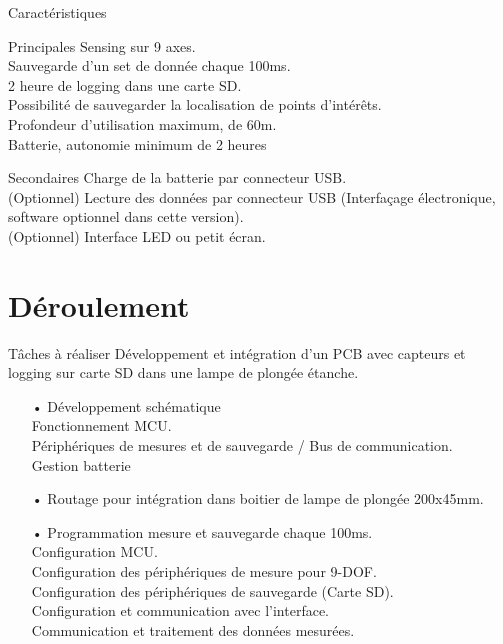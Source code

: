 \documentclass[compress,aspectratio=169]{beamer}
\begin{document}
\begin{frame}{Caractéristiques}
	\begin{alertblock}{Principales}
		Sensing sur 9 axes. \\
		Sauvegarde d’un set de donnée chaque 100ms.\\
		2 heure de logging dans une carte SD. \\
		Possibilité de sauvegarder la localisation de points d’intérêts. \\
		Profondeur d’utilisation maximum, de 60m. \\ 
		Batterie, autonomie minimum de 2 heures
	\end{alertblock}
	\begin{exampleblock}{Secondaires}
		Charge de la batterie par connecteur USB. \\
		(Optionnel) Lecture des données par connecteur USB (Interfaçage électronique, software
		optionnel dans cette version). \\
		(Optionnel) Interface LED ou petit écran.
	\end{exampleblock}
\end{frame}

\section{Déroulement}

\begin{frame}[containsverbatim]{Tâches à réaliser}
	Développement et intégration d’un PCB avec capteurs et logging sur carte SD dans une lampe de plongée étanche.
	\begin{itemize}
		\item[•] Développement schématique 
		\\ \quad Fonctionnement MCU. 
		\\ \quad Périphériques de mesures et de sauvegarde / Bus de communication. 
		\\ \quad Gestion batterie 
		\item[•]	Routage pour intégration dans boitier de lampe de plongée 200x45mm.
		\item[•]	Programmation mesure et sauvegarde chaque 100ms.
		\\	\quad Configuration MCU.
		\\	\quad Configuration des périphériques de mesure pour 9-DOF.
		\\	\quad Configuration des périphériques de sauvegarde (Carte SD).
		\\	\quad Configuration et communication avec l'interface.
		\\	\quad Communication et traitement des données mesurées.
	\end{itemize}
\end{frame}
\end{document}
